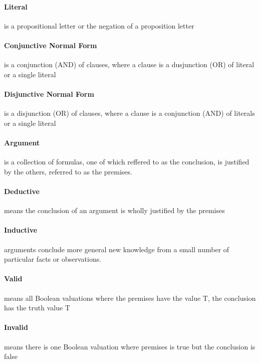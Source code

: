     \paragraph{Literal} is a propositional letter or the negation of a
    proposition letter

    \paragraph{Conjunctive Normal Form} is a conjunction (AND) of clauses,
    where a clause is a dusjunction (OR) of literal or a single literal

    \paragraph{Disjunctive Normal Form} is a disjunction (OR) of clauses, where
    a clause is a conjunction (AND) of literals or a single literal

    \paragraph{Argument} is a collection of formulas, one of which reffered to
    as the conclusion, is justified by the others, referred to as the premises.

    \paragraph{Deductive} means the conclusion of an argument is wholly
    justified by the premises

    \paragraph{Inductive} arguments conclude more general new knowledge from a
    small number of particular facts or observations.

    \paragraph{Valid} means all Boolean valuations where the premises have the
    value T, the conclusion has the truth value T

    \paragraph{Invalid} means there is one Boolean valuation where premises is
    true but the conclusion is false

